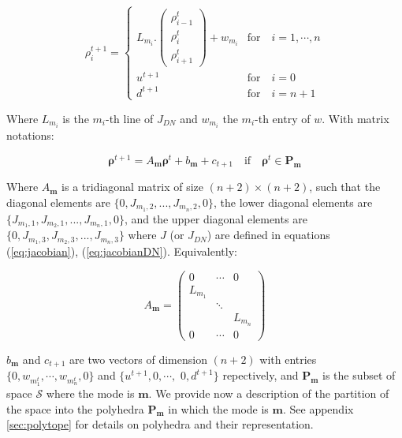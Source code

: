 \begin{equation}
\rho^{t+1}_{i} = \begin{cases}
L_{m_{i}}.\left( \begin{array}{c}
\rho^{t}_{i-1}\\
\rho^{t}_{i}\\
\rho^{t}_{i+1}
\end{array} \right)
+ w_{m_{i}} & \text{for}\quad i=1,\cdots,n\\
u^{t+1} & \text{for}\quad i=0\\
d^{t+1} & \text{for}\quad i=n+1
\end{cases}
\label{eq:underlyingSystemDN}
\end{equation}

\noindent Where $L_{m_{i}}$ is the $m_{i}$-th line of $J_{DN}$ and $w_{m_{i}}$ the $m_{i}$-th entry of $w$. With matrix notations:

\begin{equation}
\boldsymbol\rho^{t+1} = A_{\boldsymbol m} \boldsymbol\rho^{t} + b_{\boldsymbol m} + c_{t+1} \quad\text{if}\quad\boldsymbol\rho^{t}\in\textbf{P}_{\boldsymbol m}
\label{eq:underlyingSystemDN2}
\end{equation}

\noindent Where $A_{\boldsymbol m}$ is a tridiagonal matrix of size $(n+2)\times(n+2)$, such that the diagonal elements are $\{0, J_{m_{1},2},...,J_{m_{n},2},0\}$, the lower diagonal elements are $\{J_{m_{1},1},J_{m_{2},1},...,J_{m_{n},1},0\}$, and the upper diagonal elements are $\{0,J_{m_{1},3},J_{m_{2},3},...,J_{m_{n},3}\}$ where $J$ (or $J_{DN}$) are defined in equations (\ref{eq:jacobian}), (\ref{eq:jacobianDN}). Equivalently:

\begin{equation}\label{eq:matrixA}
 A_{\boldsymbol m} =
 \begin{pmatrix}
0 & \cdots & 0 \\
L_{m_{1}} & & \\
& \ddots & \\
& & L_{m_{n}}\\
0 & \cdots & 0
\end{pmatrix}
\end{equation}

\noindent $b_{\boldsymbol m}$ and $c_{t+1}$ are two vectors of dimension $(n+2)$ with entries $\{0,w_{m^{t}_{1}},\cdots,w_{m^{t}_{n}},0\}$ and $\{u^{t+1},0,\cdots,$ $0,d^{t+1}\}$ repectively, and $\textbf{P}_{\boldsymbol m}$ is the subset of space $\mathcal{S}$ where the mode is $\boldsymbol m$. We provide now a description of the partition of the space into the polyhedra $\textbf{P}_{\boldsymbol m}$ in which the mode is $\boldsymbol m$. See appendix \ref{sec:polytope} for details on polyhedra and their representation.

